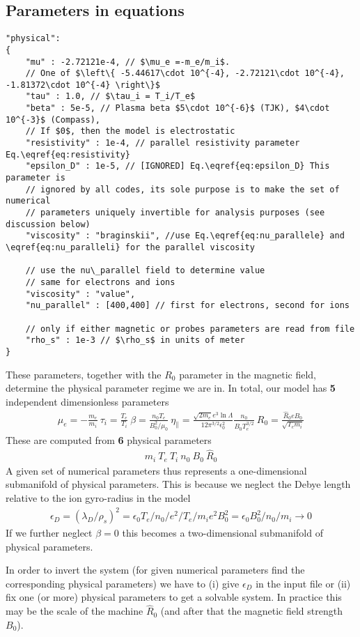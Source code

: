 \subsection{Parameters in equations} \label{sec:physical}
\begin{verbatim}
"physical":
{
    "mu" : -2.72121e-4, // $\mu_e =-m_e/m_i$.
    // One of $\left\{ -5.44617\cdot 10^{-4}, -2.72121\cdot 10^{-4}, -1.81372\cdot 10^{-4} \right\}$
    "tau" : 1.0, // $\tau_i = T_i/T_e$
    "beta" : 5e-5, // Plasma beta $5\cdot 10^{-6}$ (TJK), $4\cdot 10^{-3}$ (Compass),
    // If $0$, then the model is electrostatic
    "resistivity" : 1e-4, // parallel resistivity parameter Eq.\eqref{eq:resistivity}
    "epsilon_D" : 1e-5, // [IGNORED] Eq.\eqref{eq:epsilon_D} This parameter is
    // ignored by all codes, its sole purpose is to make the set of numerical
    // parameters uniquely invertible for analysis purposes (see discussion below)
    "viscosity" : "braginskii", //use Eq.\eqref{eq:nu_parallele} and \eqref{eq:nu_paralleli} for the parallel viscosity

    // use the nu\_parallel field to determine value
    // same for electrons and ions
    "viscosity" : "value",
    "nu_parallel" : [400,400] // first for electrons, second for ions

    // only if either magnetic or probes parameters are read from file
    "rho_s" : 1e-3 // $\rho_s$ in units of meter
}
\end{verbatim}
These parameters, together with the $R_0$ parameter in the magnetic field,
determine the physical parameter regime we are in.
In total, our model has \textbf{5} independent dimensionless parameters
\begin{align*}
    \mu_e = -\frac{m_e}{m_i}\ \tau_i = \frac{T_e}{T_i}\ \beta =
    \frac{n_0T_{e}}{B_0^2/\mu_0}\ \eta_\parallel = \frac{\sqrt{2m_e} e^3 \ln
    \Lambda} {12\pi^{3/2} \epsilon_0^2} \frac{n_0} {B_0T_e^{3/2}} \ R_0
    = \frac{\hat R_0 e B_0}{\sqrt{T_{e}m_i}}
\end{align*}
These are computed from \textbf{6} physical parameters
\begin{align*}
    m_i\ T_e\ T_i\ n_0\ B_0\ \hat R_0
\end{align*}
 A given set of numerical parameters thus represents a one-dimensional
 submanifold of physical parameters.
 This is because we neglect the Debye length relative to the ion gyro-radius
 in the model
 \begin{align}\label{eq:epsilon_D}
     \epsilon_D = (\lambda_D/\rho_s)^2 = \epsilon_0 T_e /n_0 /e^2 / T_e/m_i e^2 B_0^2 = \epsilon_0 B_0^2/n_0 /m_i \rightarrow 0
 \end{align}
If we further neglect $\beta=0$ this becomes a two-dimensional submanifold
of physical parameters.
\begin{tcolorbox}[title=Note]
    In order to invert the system (for given numerical parameters find the
    corresponding physical parameters) we have to (i) give $\epsilon_D$ in the
    input file or (ii) fix one (or more) physical
    parameters to get a solvable system.  In practice this may be the scale of
    the machine $\hat R_0$ (and after that the magnetic field strength $B_0$).
\end{tcolorbox}
